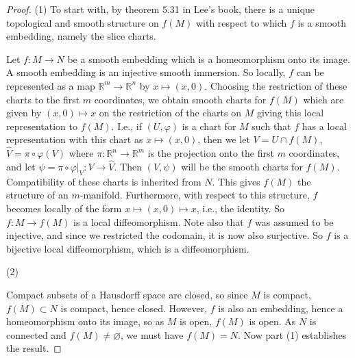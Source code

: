 \documentclass[reqno]{amsart}
\theoremstyle{definition}
\theoremstyle{remark}
\begin{document}
    \begin{proof}
        (1) To start with, by theorem 5.31 in Lee's book, there
        is a unique topological and smooth structure on
        $f(M)$ with respect to which $f$ is a smooth
        embedding, namely the slice charts.

        Let $f \colon M \to N$ be a smooth
        embedding which is a homeomorphism onto
        its image. 
        A smooth embedding is an injective smooth
        immersion. So locally, $f$ can be represented
        as a map $\mathbb{R}^{m} \to 
        \mathbb{R}^{n}$ by
        $x \mapsto (x, 0)$. Choosing the
        restriction of these charts
        to the first $m$ coordinates, we obtain smooth
        charts
        for $f(M)$ which are given by
        $\left( x,0 \right) \mapsto x$ on
        the restriction of the charts on
        $M$ giving this local representation to
        $f(M)$. I.e.,
        if $\left( U, \varphi  \right) $ 
        is a chart for $M$ such that
        $f$ has a local representation with this
        chart as
        $x \mapsto (x,0)$, then we let
        $V = U \cap f(M)$,
        $\hat{V} = 
        \pi \circ \varphi (V)$ where
        $\pi \colon \mathbb{R}^{n} \to 
        \mathbb{R}^{m}$ is the
        projection onto the first $m$ coordinates,
        and
        let $\psi =
        \pi \circ \varphi|_{V} : 
        V \to \hat{V}$. Then
        $\left( V, \psi  \right) $ will
        be the smooth charts for $f(M)$.
        Compatibility
        of these charts is inherited from
        $N$. This gives $f(M)$ the structure of
        an $m$-manifold. Furthermore, with respect to this
        structure, $f$ becomes locally of the form
        $x \mapsto (x,0) \mapsto x$, i.e., the identity.
        So $f \colon
        M \to f(M)$ is a local diffeomorphism. Note
        also that $f$ was assumed to be injective, and
        since we restricted the codomain, it is now also
        surjective. So $f$ is a bijective local diffeomorphism,
        which is a diffeomorphism.

        (2) 


        Compact subsets of a Hausdorff space are
        closed, so since $M$ is compact,
        $f(M)\subset N$ is compact, hence closed.
        However, $f$ is also an embedding, hence
        a homeomorphism onto its image, so as
        $M$ is open, $f(M)$ is open. As
        $N$ is connected and $f(M) \neq \varnothing$, we must
        have $f(M) = N$. Now part (1) establishes the
        result.
    \end{proof}
\end{document}
